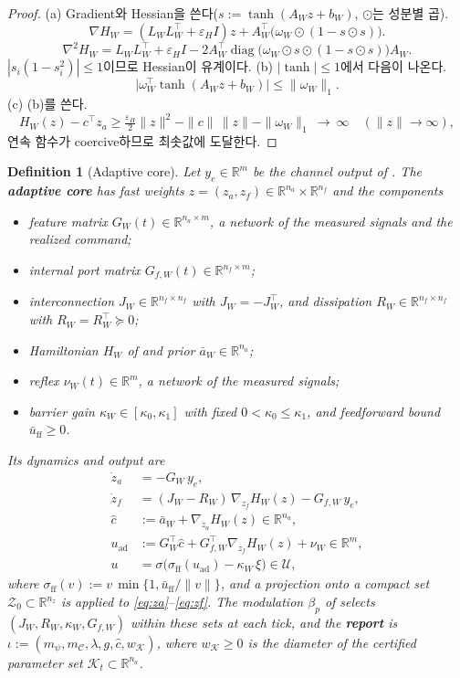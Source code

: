 \documentclass[11pt]{article}\usepackage[margin=1in]{geometry}\usepackage{amsmath,amssymb,amsthm,mathtools}\usepackage{graphicx}\graphicspath{{figures/}{../figures/}{figs/}{./}}\usepackage{enumitem}\usepackage{hyperref}\usepackage{cleveref}\usepackage{tikz}\usetikzlibrary{arrows.meta,positioning,calc,shapes.geometric}\usepackage{float}\usepackage{rotating}\usepackage[most]{tcolorbox}\usepackage{kotex}\usepackage{booktabs}\emergencystretch=1.6em\tolerance=2000 \crefname{assumption}{Assumption}{Assumptions}\Crefname{assumption}{Assumption}{Assumptions}\crefname{definition}{Definition}{Definitions}\Crefname{definition}{Definition}{Definitions}\crefname{proposition}{Proposition}{Propositions}\Crefname{proposition}{Proposition}{Propositions}\crefname{fact}{Fact}{Facts}\Crefname{fact}{Fact}{Facts} \newtheorem{assumption}{Assumption}\newtheorem{definition}{Definition}\newtheorem{lemma}{Lemma}\newtheorem{proposition}{Proposition}\newtheorem{theorem}{Theorem}\newtheorem{corollary}{Corollary}\newtheorem{fact}{Fact}\theoremstyle{remark}\newtheorem{remark}{Remark} \newcommand{\R}{\mathbb{R}}\newcommand{\xb}{\bar x}\newcommand{\Ab}{\bar A}\newcommand{\By}{\bar B_y}\newcommand{\U}{\mathcal U}\newcommand{\Z}{\mathcal Z}
\newcommand{\Cset}{\mathcal C}\newcommand{\Pcl}{\mathcal P}\newcommand{\Kset}{\mathcal K}
\begin{document}
\begin{proof}
(a) Gradient와 Hessian을 쓴다($s:=\tanh(A_Wz+b_W)$, $\odot$는 성분별 곱).
\[
\nabla H_W=(L_WL_W^\top+\varepsilon_HI)z+A_W^\top\big(\omega_W\odot(1-s\odot s)\big).
\]
\[
\nabla^2H_W=L_WL_W^\top+\varepsilon_HI-2A_W^\top\operatorname{diag}\big(\omega_W\odot s\odot(1-s\odot s)\big)A_W .
\]
$|s_i(1-s_i^2)|\le1$이므로 Hessian이 유계이다. (b) $|\tanh|\le1$에서 다음이 나온다.
\[
\big|\omega_W^\top\tanh(A_Wz+b_W)\big|\le\|\omega_W\|_1 .
\]
(c) (b)를 쓴다.
\[
H_W(z)-c^\top z_a\ge\tfrac{\varepsilon_H}{2}\|z\|^2-\|c\|\,\|z\|-\|\omega_W\|_1\ \longrightarrow\ \infty\quad(\|z\|\to\infty),
\]
연속 함수가 coercive하므로 최솟값에 도달한다.
\end{proof}

\begin{definition}[Adaptive core]
\label{def:core}
Let $y_e\in\R^m$ be the channel output of . The \textbf{\emph{adaptive core}} has fast weights $z=(z_a,z_f)\in\R^{n_a}\times\R^{n_f}$ and the components
\begin{itemize}
\item feature matrix $G_W(t)\in\R^{n_a\times m}$, a network of the measured signals and the realized command;
\item internal port matrix $G_{f,W}(t)\in\R^{n_f\times m}$;
\item interconnection $J_W\in\R^{n_f\times n_f}$ with $J_W=-J_W^\top$, and dissipation $R_W\in\R^{n_f\times n_f}$ with $R_W=R_W^\top\succeq0$;
\item Hamiltonian $H_W$ of  and prior $\bar a_W\in\R^{n_a}$;
\item reflex $\nu_W(t)\in\R^m$, a network of the measured signals;
\item barrier gain $\kappa_W\in[\kappa_0,\kappa_1]$ with fixed $0<\kappa_0\le\kappa_1$, and feedforward bound $\bar u_{\mathrm{ff}}\ge0$.
\end{itemize}
Its dynamics and output are
\begin{align}
\dot z_a&=-G_W\,y_e, \label{eq:za}\\
\dot z_f&=(J_W-R_W)\,\nabla_{z_f}H_W(z)-G_{f,W}\,y_e, \label{eq:zf}\\
\hat c&:=\bar a_W+\nabla_{z_a}H_W(z)\in\R^{n_a}, \label{eq:chat}\\
u_{\mathrm{ad}}&:=G_W^\top\hat c+G_{f,W}^\top\nabla_{z_f}H_W(z)+\nu_W\in\R^m, \label{eq:uad}\\
u&=\sigma\big(\sigma_{\mathrm{ff}}(u_{\mathrm{ad}})-\kappa_W\,\xi\big)\in\U, \label{eq:u}
\end{align}
where $\sigma_{\mathrm{ff}}(v):=v\,\min\{1,\bar u_{\mathrm{ff}}/\|v\|\}$, and a projection onto a compact set $\mathcal Z_0\subset\R^{n_z}$ is applied to \eqref{eq:za}--\eqref{eq:zf}. The modulation $\beta_p$ of  selects $(J_W,R_W,\kappa_W,G_{f,W})$ within these sets at each tick, and the \textbf{\emph{report}} is $\iota:=(m_\psi,m_{\Cset},\lambda,g,\hat c,w_{\Kset})$, where $w_{\Kset}\ge0$ is the diameter of the certified parameter set $\Kset_t\subset\R^{n_a}$.
\end{definition}
\end{document}
